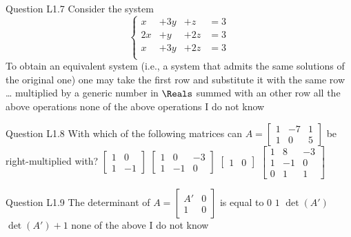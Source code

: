 \begin{frame}{Question L1.7}
	\QuestionNotes{}
	\QuestionBody
	{
		Consider the system
		$$
		\left\lbrace
		\begin{array}{rrrl}
			x & + 3 y & + z & = 3 \\
			2 x & + y & + 2 z & = 3 \\
			x & + 3 y & + 2 z & = 3 \\
		\end{array}
		\right.
		$$
		To obtain an equivalent system (i.e., a system that admits the same solutions of the original one) one may take the first row and substitute it with the same row \ldots
	}
	\QuestionAnswers
	{
		\answer multiplied by a generic number in $\Reals$
		\answer summed with an other row
		\correctanswer all the above operations
		\answer none of the above operations
		\answer I do not know
	}
\end{frame}


\begin{frame}{Question L1.8}
	\QuestionNotes{}
	\QuestionBody
	{
		With which of the following matrices can
		$A=\begin{bmatrix} 1 & -7 & 1\\ 1 & 0 & 5\end{bmatrix}$
		be right-multiplied with?
	}
	\QuestionAnswers
	{
		\answer $\begin{bmatrix} 1 & 0 \\ 1 & -1 \end{bmatrix}$
		\answer $\begin{bmatrix} 1 & 0 & -3 \\ 1 & -1 & 0 \end{bmatrix}$
		\answer $\begin{bmatrix} 1 & 0 \end{bmatrix}$
		\correctanswer $\begin{bmatrix} 1 & 8 & -3 \\ 1 & -1 & 0 \\ 0 & 1 & 1\end{bmatrix}$
	}
\end{frame}


\begin{frame}{Question L1.9}
	\QuestionNotes{}
	\QuestionBody
	{
		The determinant of 
		$A=\begin{bmatrix} A' & 0 \\ 1 & 0\end{bmatrix}$
		is equal to
	}
	\QuestionAnswers
	{
		\correctanswer $0$
		\answer $1$
		\answer $\det(A')$
		\answer $\det(A')+1$
		\answer none of the above
		\answer I do not know
	}
\end{frame}


